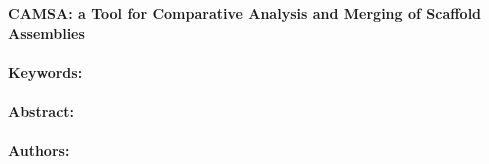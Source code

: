 \noindent
\large {\bf CAMSA: a Tool for Comparative Analysis and Merging of Scaffold Assemblies} 


\normalsize 


\noindent \paragraph{Keywords:} 

\noindent \paragraph{Abstract:} 



\noindent \paragraph{Authors:} 

